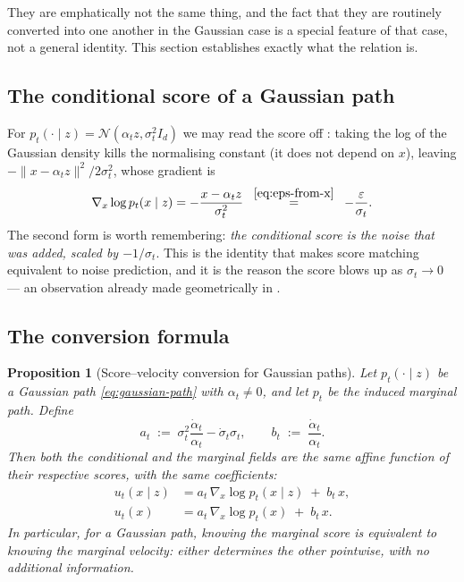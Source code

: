 \documentclass[11pt,a4paper]{report}
\newtheorem{proposition}[proposition]{Proposition}
\theoremstyle{definition}
\theoremstyle{remark}
\begin{document}
They are emphatically not the same thing, and the fact that they are
routinely converted into one another in the Gaussian case is a special
feature of that case, not a general identity. This section establishes
exactly what the relation is.

\subsection{The conditional score of a Gaussian path}

For $p_t(\cdot\mid z)=\mathcal N(\alpha_tz,\sigma_t^2I_d)$ we may read the
score off : taking the log of the Gaussian density
kills the normalising constant (it does not depend on $x$), leaving
$-\|x-\alpha_tz\|^2/2\sigma_t^2$, whose gradient is
\begin{equation}
\label{eq:gaussian-conditional-score-fm}
\nabla_x\log p_t(x\mid z) = -\frac{x-\alpha_tz}{\sigma_t^2}
\;\;\overset{\eqref{eq:eps-from-x}}{=}\;\;
-\frac{\varepsilon}{\sigma_t} .
\end{equation}
The second form is worth remembering: \emph{the conditional score is the
noise that was added, scaled by $-1/\sigma_t$}. This is the identity that
makes score matching equivalent to noise prediction, and it is the reason
the score blows up as $\sigma_t\to0$ --- an observation already made
geometrically in .

\subsection{The conversion formula}

\begin{proposition}[Score--velocity conversion for Gaussian paths]
\label{prop:score-velocity}
Let $p_t(\cdot\mid z)$ be a Gaussian path \eqref{eq:gaussian-path} with
$\alpha_t\neq0$, and let $p_t$ be the induced marginal path. Define
\begin{equation}
\label{eq:ab-coeffs}
a_t \;:=\; \sigma_t^2\frac{\dot\alpha_t}{\alpha_t}-\dot\sigma_t\sigma_t ,
\qquad
b_t \;:=\; \frac{\dot\alpha_t}{\alpha_t} .
\end{equation}
Then \emph{both} the conditional and the marginal fields are the same
affine function of their respective scores, with the same coefficients:
\begin{align}
\label{eq:conv-conditional}
u_t(x\mid z) &= a_t\,\nabla_x\log p_t(x\mid z) \;+\; b_t\,x ,\\
\label{eq:conv-marginal}
u_t(x)       &= a_t\,\nabla_x\log p_t(x)       \;+\; b_t\,x .
\end{align}
In particular, for a Gaussian path, knowing the marginal score is
equivalent to knowing the marginal velocity: either determines the other
pointwise, with no additional information.
\end{proposition}
\end{document}
